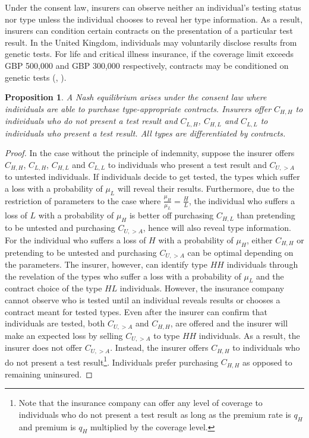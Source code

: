 \documentclass[natbib=false,preprint,12pt]{elsarticle}
\theoremstyle{plain}
\newtheorem{prop}[theorem]{Proposition}
\theoremstyle{definition}
\theoremstyle{plain}
\theoremstyle{TheoremNum}
\theoremstyle{CorollaryNum}
\theoremstyle{PropositionNum}
\theoremstyle{TheoremNum}
\begin{document}
Under the consent law, insurers can observe neither an individual's testing status nor type unless the individual chooses to reveal her type information. As a result, insurers can condition certain contracts on the presentation of a particular test result. In the United Kingdom, individuals may voluntarily disclose results from genetic tests. For life and critical illness insurance, if the coverage limit exceeds GBP 500,000 and GBP 300,000 respectively, contracts may be conditioned on genetic tests (\citeauthor{ABI_2018}, \citeyear{ABI_2018}). 

\setcounter{theorem}{8}
\renewcommand{\thetheorem}{\arabic{theorem}}
\begin{prop}
A Nash equilibrium arises under the consent law where individuals are able to purchase type-appropriate contracts. Insurers offer $C_{H,H}$ to individuals who do not present a test result and $C_{L,H}$, $C_{H,L}$ and $C_{L,L}$ to individuals who present a test result. All types are differentiated by contracts.
\end{prop}

\begin{proof}
In the case without the principle of indemnity, suppose the insurer offers $C_{H,H}$, $C_{L,H}$, $C_{H,L}$ and $C_{L,L}$ to individuals who present a test result and $C_{U,>A}$ to untested individuals. If individuals decide to get tested, the types which suffer a loss with a probability of $\mu_L$ will reveal their results. Furthermore, due to the restriction of parameters to the case where $\frac{\mu_H}{\mu_L} = \frac{H}{L}$, the individual who suffers a loss of $L$ with a probability of $\mu_H$ is better off purchasing $C_{H,L}$ than pretending to be untested and purchasing $C_{U,>A}$, hence will also reveal type information. For the individual who suffers a loss of $H$ with a probability of $\mu_H$, either $C_{H,H}$ or pretending to be untested and purchasing $C_{U,>A}$ can be optimal depending on the parameters. The insurer, however, can identify type $HH$ individuals through the revelation of the types who suffer a loss with a probability of $\mu_L$ and the contract choice of the type  $HL$ individuals. However, the insurance company cannot observe who is tested until an individual reveals results or chooses a contract meant for tested types. Even after the insurer can confirm that individuals are tested, both $C_{U,>A}$ and $C_{H,H}$, are offered and the insurer will make an expected loss by selling $C_{U,>A}$ to type $HH$ individuals. As a result, the insurer does not offer $C_{U,>A}$. Instead, the insurer offers $C_{H,H}$ to individuals who do not present a test result\footnote{Note that the insurance company can offer any level of coverage to individuals who do not present a test result as long as the premium rate is $q_H$ and premium is $q_H$ multiplied by the coverage level.}. Individuals prefer purchasing $C_{H,H}$ as opposed to remaining uninsured.
\end{proof}
\end{document}
